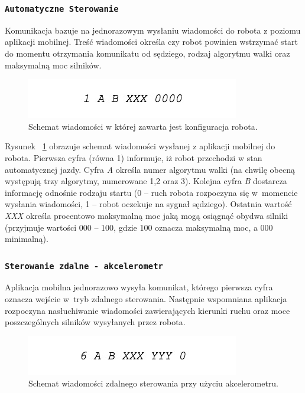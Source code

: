  \subsubsection{\lstinline$Automatyczne Sterowanie$}

Komunikacja bazuje na jednorazowym wysłaniu wiadomości do robota z poziomu aplikacji mobilnej. Treść wiadomości określa czy robot powinien wstrzymać start do momentu otrzymania komunikatu od sędziego, rodzaj algorytmu walki oraz maksymalną moc silników.

\begin{figure}[H]
	\centering
		\includegraphics[width=0.75\linewidth]{pic03/automatic.jpg}
	\caption{Schemat wiadomości w której zawarta jest konfiguracja robota.}
	\label{fig:automatic}	
\end{figure}

Rysunek ~\ref{fig:automatic} obrazuje schemat wiadomości wysłanej z aplikacji mobilnej do robota. Pierwsza cyfra (równa 1) informuje, iż robot przechodzi w stan automatycznej jazdy. Cyfra \textit{A} określa numer algorytmu walki (na chwilę obecną występują trzy algorytmy, numerowane 1,2 oraz 3). Kolejna cyfra \textit{B} dostarcza informację odnośnie rodzaju startu (0 – ruch robota rozpoczyna się w~momencie wysłania wiadomości, 1 – robot oczekuje na sygnał sędziego). Ostatnia wartość \textit{XXX} określa procentowo maksymalną moc jaką mogą osiągnąć obydwa silniki (przyjmuje wartości 000 – 100, gdzie 100 oznacza maksymalną moc, a 000 minimalną).

 \subsubsection{\lstinline$Sterowanie zdalne - akcelerometr$}

Aplikacja mobilna jednorazowo wysyła komunikat, którego pierwsza cyfra oznacza wejście w~tryb zdalnego sterowania. Następnie wspomniana aplikacja rozpoczyna nasłuchiwanie wiadomości zawierających kierunki ruchu oraz moce poszczególnych silników wysyłanych przez robota.

\begin{figure}[H]
	\centering
		\includegraphics[width=0.75\linewidth]{pic03/accelerometer.jpeg}
	\caption{Schemat wiadomości zdalnego sterowania przy użyciu akcelerometru.}
	\label{fig:accelerometer}	
\end{figure}

